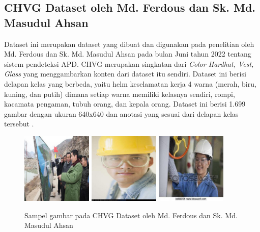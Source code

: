 \subsection{CHVG Dataset oleh Md. Ferdous dan Sk. Md. Masudul Ahsan}
\label{chvgdataset}

\par Dataset ini merupakan dataset yang dibuat dan digunakan pada penelitian oleh Md. Ferdous dan Sk. Md. Masudul Ahsan pada bulan Juni tahun 2022 tentang sistem pendeteksi APD.
CHVG merupakan singkatan dari \textit{Color Hardhat, Vest, Glass} yang menggambarkan konten dari dataset itu sendiri. Dataset ini berisi delapan kelas yang berbeda, yaitu helm keselamatan kerja 4 warna (merah, biru, kuning, dan putih) dimana setiap warna memiliki kelasnya sendiri, rompi, kacamata pengaman, tubuh orang, dan kepala orang.
Dataset ini berisi 1.699 gambar dengan ukuran 640x640 dan anotasi yang sesuai dari delapan kelas tersebut \cite{Ferdous2022}.

\begin{figure}[ht]
  \centering
  \includegraphics[width=0.3\textwidth]{gambar/chvg1}
  \includegraphics[width=0.3\textwidth]{gambar/chvg2}
  \includegraphics[width=0.3\textwidth]{gambar/chvg3}
  \caption{Sampel gambar pada CHVG Dataset oleh Md. Ferdous dan Sk. Md. Masudul Ahsan}
  \label{fig:datasetapdpreview}
\end{figure}

